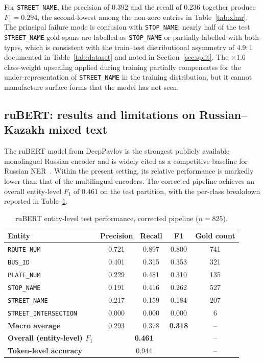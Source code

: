 For \texttt{STREET\_NAME}, the precision of $0.392$ and the recall of $0.236$ together produce $F_1 = 0.294$, the second-lowest among the non-zero entries in Table~\ref{tab:xlmr}. The principal failure mode is confusion with \texttt{STOP\_NAME}: nearly half of the test \texttt{STREET\_NAME} gold spans are labelled as \texttt{STOP\_NAME} or partially labelled with both types, which is consistent with the train--test distributional asymmetry of $4.9{:}1$ documented in Table~\ref{tab:dataset} and noted in Section~\ref{sec:split}. The $\times1.6$ class-weight upscaling applied during training partially compensates for the under-representation of \texttt{STREET\_NAME} in the training distribution, but it cannot manufacture surface forms that the model has not seen.

\subsection{ruBERT: results and limitations on Russian--Kazakh mixed text}
\label{sec:rubert_results}

The ruBERT model from DeepPavlov is the strongest publicly available monolingual Russian encoder and is widely cited as a competitive baseline for Russian NER~\cite{kassab2025russian}. Within the present setting, its relative performance is markedly lower than that of the multilingual encoders. The corrected pipeline achieves an overall entity-level $F_1$ of $0.461$ on the test partition, with the per-class breakdown reported in Table~\ref{tab:rubert}.

\begin{table}[H]
\centering
\caption{ruBERT entity-level test performance, corrected pipeline ($n=825$).}
\label{tab:rubert}
\renewcommand{\arraystretch}{1.3}
\begin{tabular}{lcccc}
\toprule
\textbf{Entity} & \textbf{Precision} & \textbf{Recall} & \textbf{F1} & \textbf{Gold count} \\
\midrule
\texttt{ROUTE\_NUM}           & 0.721 & 0.897 & 0.800 & 741 \\
\texttt{BUS\_ID}              & 0.401 & 0.315 & 0.353 & 321 \\
\texttt{PLATE\_NUM}           & 0.229 & 0.481 & 0.310 & 135 \\
\texttt{STOP\_NAME}           & 0.191 & 0.416 & 0.262 & 527 \\
\texttt{STREET\_NAME}         & 0.217 & 0.159 & 0.184 & 207 \\
\texttt{STREET\_INTERSECTION} & 0.000 & 0.000 & 0.000 & 6 \\
\midrule
\textbf{Macro average}        & 0.293 & 0.378 & \textbf{0.318} & -- \\
\textbf{Overall (entity-level) $F_1$} & \multicolumn{3}{c}{\textbf{0.461}} & -- \\
\textbf{Token-level accuracy}  & \multicolumn{3}{c}{0.944} & -- \\
\bottomrule
\end{tabular}
\end{table}

